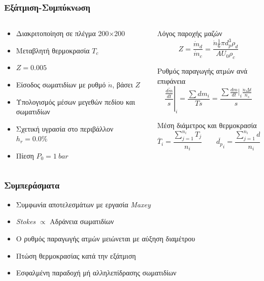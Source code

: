 \documentclass[12pt, hyperref={pdfpagelabels=false},aspectratio=169,fleqn, greek]{beamer}
\begin{document}
\begin{frame}
	\frametitle{Εξάτμιση-Συμπύκνωση}	
	\begin{columns}[c]
    	\begin{column}{0.5\textwidth}
			\begin{itemize}
				\item Διακριτοποίηση σε πλέγμα 200$\times$200
				\item Μεταβλητή θερμοκρασία $T_c$
				\item $Ζ=0.005$
				\item Είσοδος σωματιδίων με ρυθμό $\dot{n}$, βάσει $Ζ$
				\item Υπολογισμός μέσων μεγεθών πεδίου και σωματιδίων
				\item Σχετική υγρασία στο περιβάλλον $h_r = 0.0\%$
				\item Πίεση $P_0 = 1~bar$
			\end{itemize}
		\end{column}
    	\begin{column}{0.5\textwidth}
			\vspace{-12pt}
			\begin{exampleblock}{\small Λόγος παροχής μαζών}
				$$ Z = \frac{\dot{m}_d}{\dot{m}_c} = \frac{\dot{n} \frac{1}{6} \pi d_p^3 \rho_d}{A U_0 \rho_c}$$
			\end{exampleblock}
			\begin{exampleblock}{\small Ρυθμός παραγωγής ατμών ανά επιφάνεια}
				\vspace{-12pt}
				$$\left.{\frac{\overline{\frac{dm}{dt}}}{s}}\right|_i = \frac{\sum dm_i}{T s}  = 
				\frac{\sum \frac{dm}{dt}\vert_i \frac{\dot{n} \Delta t}{n_s} }{ s}$$
			\end{exampleblock}
			\begin{exampleblock}{\small Μέση διάμετρος και θερμοκρασία}
				\vspace{-2pt}
				\footnotesize
				$$\overline{T}_i = \frac{\sum\limits_{j=1}^{n_i} T_j}{n_i} \qquad
				\overline{d_p}_i = \frac{\sum\limits_{j=1}^{n_i} d_{p,j}}{n_i}$$
			\end{exampleblock}
   		\end{column}
   	\end{columns}	
\end{frame}

\begin{frame}
	\frametitle{Συμπεράσματα}
	\begin{itemize}
		\item Συμφωνία αποτελεσμάτων με εργασία \textit{Maxey}
		\item \textit{Stokes} $\propto$ Αδράνεια σωματιδίων
		\item O ρυθμός παραγωγής ατμών μειώνεται με αύξηση διαμέτρου 
		\item Πτώση θερμοκρασίας κατά την εξάτμιση
		\item Εσφαλμένη παραδοχή μή αλληλεπίδρασης σωματιδίων
	\end{itemize}
\end{frame}
\end{document}
